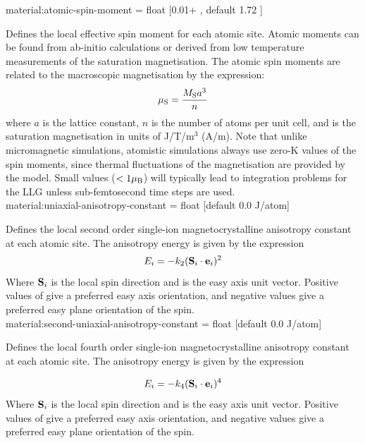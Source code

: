 {\zicf material:atomic-spin-moment = float [0.01+ \muB, default 1.72 \muB]}
Defines the local effective spin moment for each atomic site. Atomic moments can be found from ab-initio calculations or derived from low temperature measurements of the saturation magnetisation. The atomic spin moments are related to the macroscopic magnetisation by the expression:
\begin{equation*}
\mu_\mathrm{S} = \frac{M_\mathrm{S} a^3}{n}
\end{equation*}
where $a$ is the lattice constant, $n$ is the number of atoms per unit cell, and \Ms is the saturation magnetisation in units of J/T/m$^3$ (A/m). Note that unlike micromagnetic simulations, atomistic simulations always use zero-K values of the spin moments, since thermal fluctuations of the magnetisation are provided by the model. Small values ($<1 \mu_\mathrm{B}$) will typically lead to integration problems for the LLG unless sub-femtosecond time steps are used.\\

{\zicf material:uniaxial-anisotropy-constant = float [default 0.0 J/atom]} 
  Defines the local second order single-ion magnetocrystalline anisotropy constant at each atomic site. The anisotropy energy is given by the expression 
\begin{equation*}
E_i = -k_{2} (\mathbf{S}_i \cdot \mathbf{e}_i)^2
\end{equation*}
Where $\mathbf{S}_i$ is the local spin direction and \ei is the easy axis unit vector. Positive values of \kuu give a preferred easy axis orientation, and negative values give a preferred easy plane orientation of the spin.\\

{\zicf material:second-uniaxial-anisotropy-constant = float [default 0.0 J/atom]} 
  Defines the local fourth order single-ion magnetocrystalline anisotropy constant at each atomic site. The anisotropy energy is given by the expression 
 
\begin{equation*}
E_i = -k_{4} (\mathbf{S}_i \cdot \mathbf{e}_i)^4
\end{equation*}
Where $\mathbf{S}_i$ is the local spin direction and \ei is the easy axis unit vector. Positive values of \kuuuu give a preferred easy axis orientation, and negative values give a preferred easy plane orientation of the spin.\\

